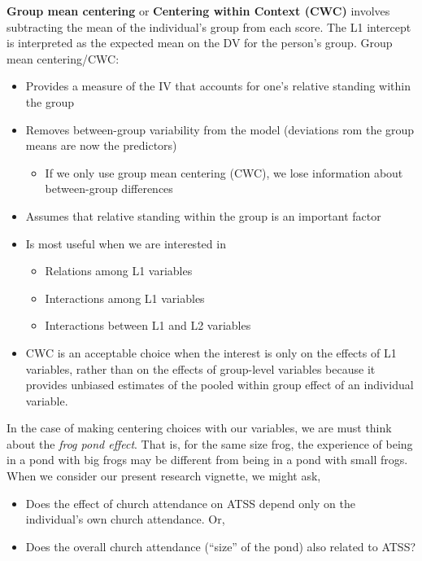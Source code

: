 \documentclass[
  english,
]{book}
\providecommand{\tightlist}{%
  \setlength{\itemsep}{0pt}\setlength{\parskip}{0pt}}
\begin{document}
\textbf{Group mean centering} or \textbf{Centering within Context (CWC)} involves subtracting the mean of the individual's group from each score. The L1 intercept is interpreted as the expected mean on the DV for the person's group. Group mean centering/CWC:

\begin{itemize}
\tightlist
\item
  Provides a measure of the IV that accounts for one's relative standing within the group
\item
  Removes between-group variability from the model (deviations rom the group means are now the predictors)

  \begin{itemize}
  \tightlist
  \item
    If we only use group mean centering (CWC), we lose information about between-group differences
  \end{itemize}
\item
  Assumes that relative standing within the group is an important factor
\item
  Is most useful when we are interested in

  \begin{itemize}
  \tightlist
  \item
    Relations among L1 variables
  \item
    Interactions among L1 variables
  \item
    Interactions between L1 and L2 variables
  \end{itemize}
\item
  CWC is an acceptable choice when the interest is only on the effects of L1 variables, rather than on the effects of group-level variables because it provides unbiased estimates of the pooled within group effect of an individual variable.
\end{itemize}

In the case of making centering choices with our variables, we are must think about the \emph{frog pond effect}. That is, for the same size frog, the experience of being in a pond with big frogs may be different from being in a pond with small frogs. When we consider our present research vignette, we might ask,

\begin{itemize}
\tightlist
\item
  Does the effect of church attendance on ATSS depend only on the individual's own church attendance. Or,
\item
  Does the overall church attendance (``size'' of the pond) also related to ATSS?
\end{itemize}
\end{document}
